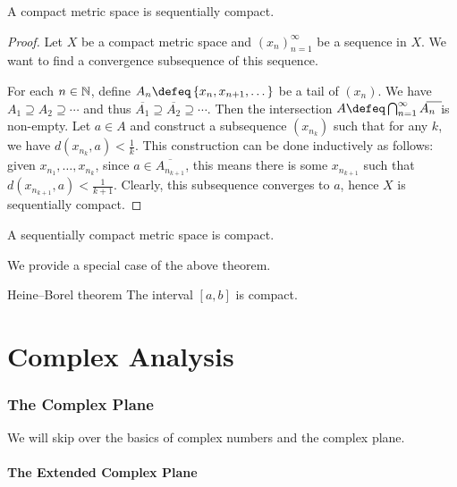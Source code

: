 \documentclass{styles/tufte}
\begin{document}
  \begin{theorem}{}{}
    A compact metric space is sequentially compact.
  \end{theorem}
  \begin{proof}
    Let $X$ be a compact metric space and $(x_n)_{n=1}^\infty$ be a sequence in $X$. We want to find a convergence subsequence of this sequence.
    
    For each $n \in \mathbb{N}$, define $A_n \defeq \set{x_n, x_{n+1}, \dots}$ be a tail of $(x_n)$. We have $A_1 \supseteq A_2 \supseteq \cdots$ and thus $\overline{A_1} \supseteq \overline{A_2} \supseteq \cdots$. Then the intersection $A \defeq \bigcap_{n=1}^\infty \overline{A_n}$ is non-empty. Let $a \in A$ and construct a subsequence $(x_{n_k})$ such that for any $k$, we have $d(x_{n_k}, a) < \frac{1}{k}$. This construction can be done inductively as follows: given $x_{n_1}, \dots, x_{n_k}$, since $a \in \overline{A_{n_{k + 1}}}$, this means there is some $x_{n_{k + 1}}$ such that $d(x_{n_{k + 1}}, a) < \frac{1}{k + 1}$. Clearly, this subsequence converges to $a$, hence $X$ is sequentially compact.
  \end{proof}
  
  \begin{theorem}{}{}
    A sequentially compact metric space is compact.
  \end{theorem}
  
  We provide a special case of the above theorem.
  \begin{theorem}{Heine--Borel theorem}{}
    The interval $[a, b]$ is compact.
  \end{theorem}




\newpage
\part{Complex Analysis}

\section{The Complex Plane}

We will skip over the basics of complex numbers and the complex plane.

\subsection{The Extended Complex Plane}
  
\end{document}
